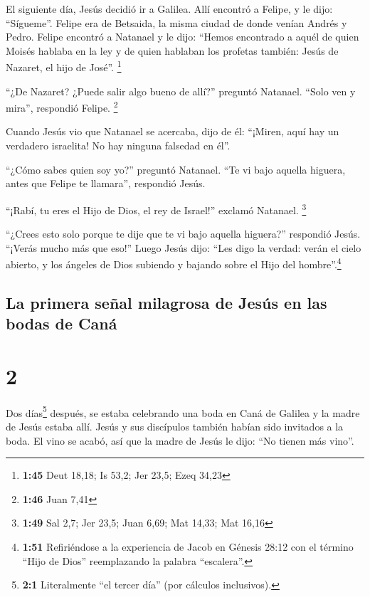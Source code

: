  El siguiente día, Jesús decidió ir a Galilea. Allí
encontró a Felipe, y le dijo: ``Sígueme''.  Felipe era de
Betsaida, la misma ciudad de donde venían Andrés y Pedro.
 Felipe encontró a Natanael y le dijo: ``Hemos encontrado
a aquél de quien Moisés hablaba en la ley y de quien hablaban los
profetas también: Jesús de Nazaret, el hijo de José''. \footnote{\textbf{1:45}
  Deut 18,18; Is 53,2; Jer 23,5; Ezeq 34,23}

 ``¿De Nazaret? ¿Puede salir algo bueno de allí?''
preguntó Natanael. ``Solo ven y mira'', respondió Felipe. \footnote{\textbf{1:46}
  Juan 7,41}

 Cuando Jesús vio que Natanael se acercaba, dijo de él:
``¡Miren, aquí hay un verdadero israelita! No hay ninguna falsedad en
él''.

 ``¿Cómo sabes quien soy yo?'' preguntó Natanael. ``Te vi
bajo aquella higuera, antes que Felipe te llamara'', respondió Jesús.

 ``¡Rabí, tu eres el Hijo de Dios, el rey de Israel!''
exclamó Natanael. \footnote{\textbf{1:49} Sal 2,7; Jer 23,5; Juan 6,69;
  Mat 14,33; Mat 16,16}

 ``¿Crees esto solo porque te dije que te vi bajo aquella
higuera?'' respondió Jesús. ``¡Verás mucho más que eso!''
 Luego Jesús dijo: ``Les digo la verdad: verán el cielo
abierto, y los ángeles de Dios subiendo y bajando sobre el Hijo del
hombre''.\footnote{\textbf{1:51} Refiriéndose a la experiencia de Jacob
  en Génesis 28:12 con el término ``Hijo de Dios'' reemplazando la
  palabra ``escalera''.}

\hypertarget{la-primera-seuxf1al-milagrosa-de-jesuxfas-en-las-bodas-de-canuxe1}{%
\subsection{La primera señal milagrosa de Jesús en las bodas de
Caná}\label{la-primera-seuxf1al-milagrosa-de-jesuxfas-en-las-bodas-de-canuxe1}}

\hypertarget{section-1}{%
\section{2}\label{section-1}}

 Dos días\footnote{\textbf{2:1} Literalmente ``el tercer
  día'' (por cálculos inclusivos).} después, se estaba celebrando una
boda en Caná de Galilea y la madre de Jesús estaba allí. 
Jesús y sus discípulos también habían sido invitados a la boda.
 El vino se acabó, así que la madre de Jesús le dijo: ``No
tienen más vino''.

